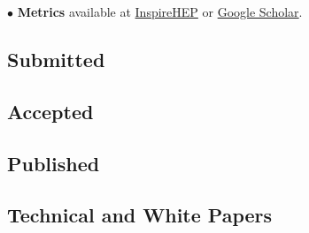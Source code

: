 \documentclass[11pt,letterpaper,sans,unicode]{moderncv}
\begin{document}


\hspace{0.2in}$\bullet$ \textbf{Metrics} available at {\color{color1} \href{https://inspirehep.net/literature?sort=mostrecent&size=25&page=1&q=a%20J.S.Hazboun.1&ui-citation-summary=true}{InspireHEP} or \href{https://scholar.google.com/citations?user=CbNY_MYAAAAJ&hl=en}{Google Scholar}}.

\subsection{\hspace{0.2in}Submitted}

\begin{etaremune}[leftmargin=16mm]

\end{etaremune}

\subsection{\hspace{0.2in}Accepted}

\begin{etaremune}[leftmargin=16mm]

\end{etaremune}

\subsection{\hspace{0.2in}Published}

\begin{etaremune}[leftmargin=16mm]

\end{etaremune}

\subsection{\hspace{0.2in}Technical and White Papers}
\end{document}
